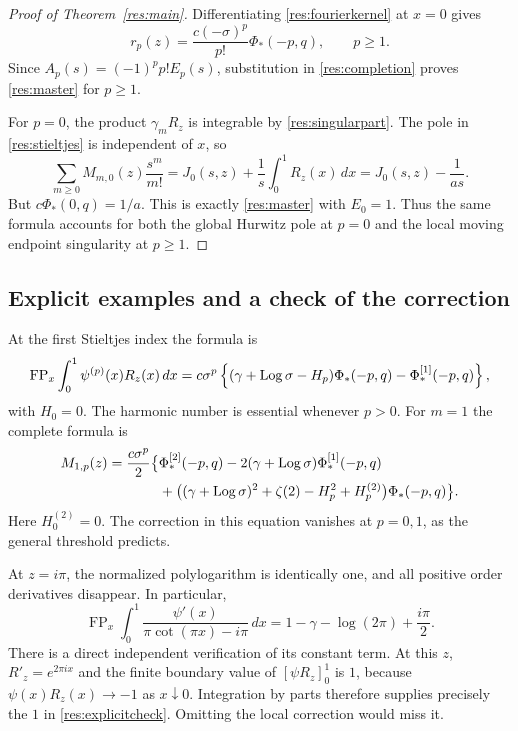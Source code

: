 \begin{proof}[Proof of Theorem~\ref{res:main}]
Differentiating \eqref{res:fourierkernel} at $x=0$ gives
\begin{equation}\label{res:rj}
 r_p(z)=\frac{c(-\sigma)^p}{p!}\Phi_*(-p,q),\qquad p\ge1.
\end{equation}
Since $A_p(s)=(-1)^pp!E_p(s)$, substitution in
\eqref{res:completion} proves \eqref{res:master} for $p\ge1$.

For $p=0$, the product $\gamma_m R_z$ is integrable by
\eqref{res:singularpart}. The pole in \eqref{res:stieltjes} is
independent of $x$, so
\[
 \sum_{m\ge0}M_{m,0}(z)\frac{s^m}{m!}
       =J_0(s,z)+\frac1s\int_0^1R_z(x)\,dx
       =J_0(s,z)-\frac1{as}.
\]
But $c\Phi_*(0,q)=1/a$. This is exactly
\eqref{res:master} with $E_0=1$. Thus the same formula accounts
for both the global Hurwitz pole at $p=0$ and the local moving
endpoint singularity at $p\ge1$.
\end{proof}

\subsection{Explicit examples and a check of the correction}

At the first Stieltjes index the formula is
\begin{equation}\label{res:polygamma}
 \operatorname{FP}_x\int_0^1\psi^{(p)}(x)R_z(x)\,dx
  =c\sigma^p\left\{(\gamma+\operatorname{Log}\sigma-H_p)\Phi_*(-p,q)
                                      -\Phi_*^{[1]}(-p,q)\right\},
\end{equation}
with $H_0=0$. The harmonic number is essential whenever $p>0$.
For $m=1$ the complete formula is
\begin{align}\label{res:gamma1}
 M_{1,p}(z)=\frac{c\sigma^p}{2}\bigl\{
  &\Phi_*^{[2]}(-p,q)-2(\gamma+\operatorname{Log}\sigma)\Phi_*^{[1]}(-p,q)\notag\\
  &+\bigl((\gamma+\operatorname{Log}\sigma)^2+\zeta(2)
                      -H_p^2+H_p^{(2)}\bigr)\Phi_*(-p,q)\bigr\}.
\end{align}
Here $H_0^{(2)}=0$. The correction in this equation vanishes at
$p=0,1$, as the general threshold predicts.

At $z=i\pi$, the normalized polylogarithm is identically one,
and all positive order derivatives disappear. In particular,
\begin{equation}\label{res:explicitcheck}
 \operatorname{FP}_x\int_0^1
       \frac{\psi'(x)}{\pi\cot(\pi x)-i\pi}\,dx
       =1-\gamma-\log(2\pi)+\frac{i\pi}{2}.
\end{equation}
There is a direct independent verification of its constant term.
At this $z$, $R'_z=e^{2\pi ix}$ and the finite boundary value of
$[\psi R_z]_0^1$ is $1$, because $\psi(x)R_z(x)\to-1$ as
$x\downarrow0$. Integration by parts therefore supplies precisely
the $1$ in \eqref{res:explicitcheck}. Omitting the local correction
would miss it.

